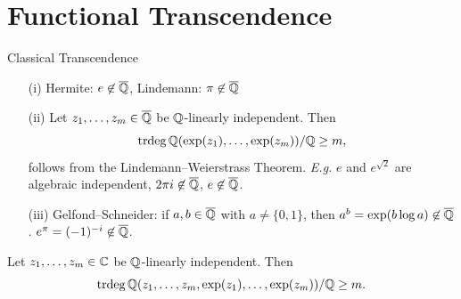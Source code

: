 \documentclass{beamer}
\begin{document}





\section{Functional Transcendence}

\begin{frame}{Classical Transcendence}
  \begin{example}
    \begin{enumerate}
    \item[(i)] Hermite:  $e\not\in{\overline{\mathbb{Q}}}$, Lindemann: $\pi
      \not\in{\overline{\mathbb{Q}}}$
    \item[(ii)] Let $z_1,\ldots,z_m\in{\overline{\mathbb{Q}}}$ be
      ${\mathbb{Q}}$-linearly independent. Then
      \begin{equation*}
        \mathrm{trdeg}\,{\mathbb{Q}}(\exp(z_1),\ldots,\exp(z_m))/{\mathbb{Q}} \ge m,
      \end{equation*}
      follows from the \alert{Lindemann--Weierstrass Theorem}.
      \textit{E.g.} $e$ and $e^{\sqrt{2}} $ are algebraic independent,
      $2\pi i \not\in {\overline{\mathbb{Q}}}$, $e\not\in{\overline{\mathbb{Q}}}$.
    \item[(iii)] Gelfond--Schneider: if $a,b\in{\overline{\mathbb{Q}}}$ with
      $a\not=\{0,1\}$, then $a^b = \exp(b \log a)\not\in {\overline{\mathbb{Q}}}$.
      $e^\pi = (-1)^{-i}\not\in{\overline{\mathbb{Q}}}$.       
    \end{enumerate}
  \end{example}
  
  \begin{conjecture}[Schanuel]
    Let $z_1,\ldots,z_m\in{\mathbb{C}}$ be ${\mathbb{Q}}$-linearly independent. Then
    \begin{equation*}
      \mathrm{trdeg}\, {\mathbb{Q}}(z_1,\ldots,z_m,\exp(z_1),\ldots,\exp(z_m))/{\mathbb{Q}} \ge
      m. 
    \end{equation*}
  \end{conjecture}
\end{frame}
\end{document}
